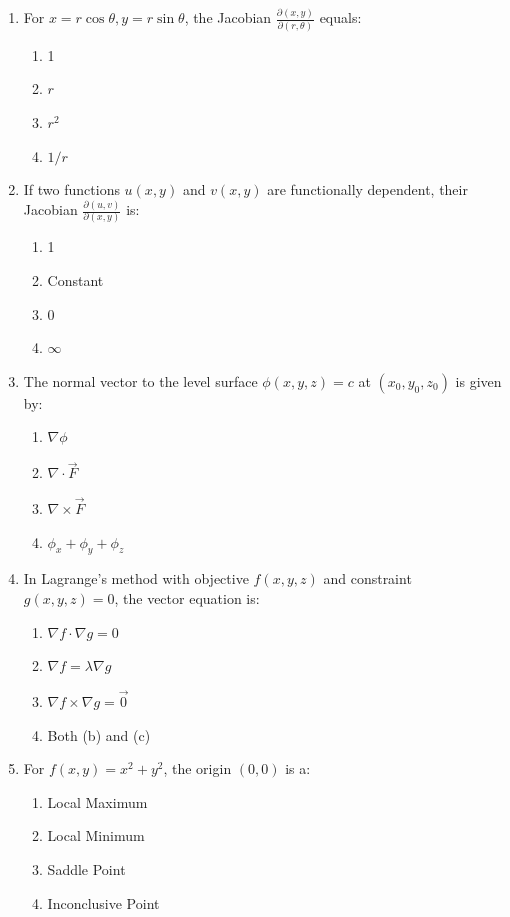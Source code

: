 \begin{enumerate}[leftmargin=1.5em]
    \item For $x = r\cos\theta, y = r\sin\theta$, the Jacobian $\frac{\partial(x,y)}{\partial(r,\theta)}$ equals:
    \begin{enumerate}[label=(\alph*)]
        \item 1
        \item $r$
        \item $r^2$
        \item $1/r$
    \end{enumerate}

    \item If two functions $u(x,y)$ and $v(x,y)$ are functionally dependent, their Jacobian $\frac{\partial(u,v)}{\partial(x,y)}$ is:
    \begin{enumerate}[label=(\alph*)]
        \item 1
        \item Constant
        \item 0
        \item $\infty$
    \end{enumerate}

    \item The normal vector to the level surface $\phi(x,y,z) = c$ at $(x_0,y_0,z_0)$ is given by:
    \begin{enumerate}[label=(\alph*)]
        \item $\nabla\phi$
        \item $\nabla\cdot\vec{F}$
        \item $\nabla\times\vec{F}$
        \item $\phi_x + \phi_y + \phi_z$
    \end{enumerate}

    \item In Lagrange's method with objective $f(x,y,z)$ and constraint $g(x,y,z)=0$, the vector equation is:
    \begin{enumerate}[label=(\alph*)]
        \item $\nabla f \cdot \nabla g = 0$
        \item $\nabla f = \lambda \nabla g$
        \item $\nabla f \times \nabla g = \vec{0}$
        \item Both (b) and (c)
    \end{enumerate}

    \item For $f(x,y) = x^2 + y^2$, the origin $(0,0)$ is a:
    \begin{enumerate}[label=(\alph*)]
        \item Local Maximum
        \item Local Minimum
        \item Saddle Point
        \item Inconclusive Point
    \end{enumerate}


\end{enumerate}
